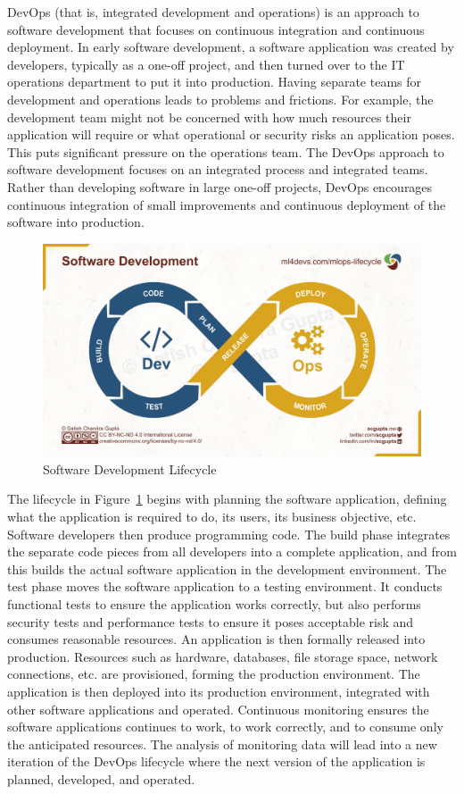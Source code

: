 DevOps (that is, integrated development and operations) is an approach to software development that focuses on continuous integration and continuous deployment. In early software development, a software application was created by developers, typically as a one-off project, and then turned over to the IT operations department to put it into production. Having separate teams for development and operations leads to problems and frictions. For example, the development team might not be concerned with how much resources their application will require or what operational or security risks an application poses. This puts significant pressure on the operations team. The DevOps approach to software development focuses on an integrated process and integrated teams. Rather than developing software in large one-off projects, DevOps encourages continuous integration of small improvements and continuous deployment of the software into production. 

\begin{figure}[h]
\centering
\includegraphics[width=.8\textwidth]{devopsmodel.jpeg}
\caption{Software Development Lifecycle}
\label{fig:devopsmodel}
\end{figure}

The lifecycle in Figure~\ref{fig:devopsmodel} begins with planning the software application, defining what the application is required to do, its users, its business objective, etc. Software developers then produce programming code. The build phase integrates the separate code pieces from all developers into a complete application, and from this builds the actual software application in the development environment. The test phase moves the software application to a testing environment. It conducts functional tests to ensure the application works correctly, but also performs security tests and performance tests to ensure it poses acceptable risk and consumes reasonable resources. An application is then formally released into production. Resources such as hardware, databases, file storage space, network connections, etc. are provisioned, forming the production environment. The application is then deployed into its production environment, integrated with other software applications and operated. Continuous monitoring ensures the software applications continues to work, to work correctly, and to consume only the anticipated resources. The analysis of monitoring data will lead into a new iteration of the DevOps lifecycle where the next version of the application is planned, developed, and operated.

